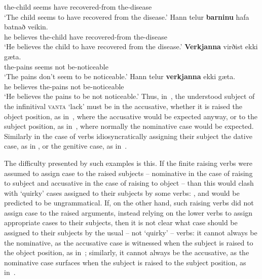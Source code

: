 \documentclass[output=paper]{langsci/langscibook}
\begin{document}
      the-child\DAT{} seems have\INF{} recovered-from the-disease\\
\glt `The child seems to have recovered from the disease.'
\ex
\gll   Hann telur \textbf{barninu} hafa batnað veikin. \\
      he believes the-child\DAT{} have\INF{} recovered-from the-disease\\
\glt    `He believes the child to have recovered from the disease.'
\zl
\eal
\label{isl:gen}
\ex
\gll   \textbf{Verkjanna} virðist ekki g\ae{}ta. \\
      the-pains\GEN{} seems not be-noticeable\INF{}\\
\glt    `The pains don't seem to be noticeable.'
\ex
\gll Hann telur \textbf{verkjanna} ekki g\ae{}ta. \\
     he believes the-pains\GEN{} not be-noticeable\INF{}\\
\glt `He believes the pains to be not noticeable.'
\zl
Thus, in~, the understood subject of the infinitival \textsc{vanta} `lack’ must be in the accusative, whether it is raised the object position, as in~, where the accusative would be expected anyway, or to the subject position, as in~, where normally the nominative case would be expected.  Similarly in the case of verbs idiosyncratically assigning their subject the dative case, as in , or the genitive case, as in~.

The difficulty presented by such examples is this. If the finite raising verbs were assumed to assign case to the raised subjects – nominative in the case of raising to subject and accusative in the case of raising to object – than this would clash with `quirky’ cases assigned to their subjects by some verbs: ,  and  would be predicted to be ungrammatical.  If, on the other hand, such raising verbs did not assign case to the raised arguments, instead relying on the lower verbs to assign appropriate cases to their subjects, then it is not clear what case should be assigned to their subjects by the usual – not `quirky’ – verbs: it cannot always be the nominative, as the accusative case is witnessed when the subject is raised to the object position, as in~; similarly, it cannot always be the accusative, as the nominative case surfaces when the subject is raised to the subject position, as in~.
\end{document}
